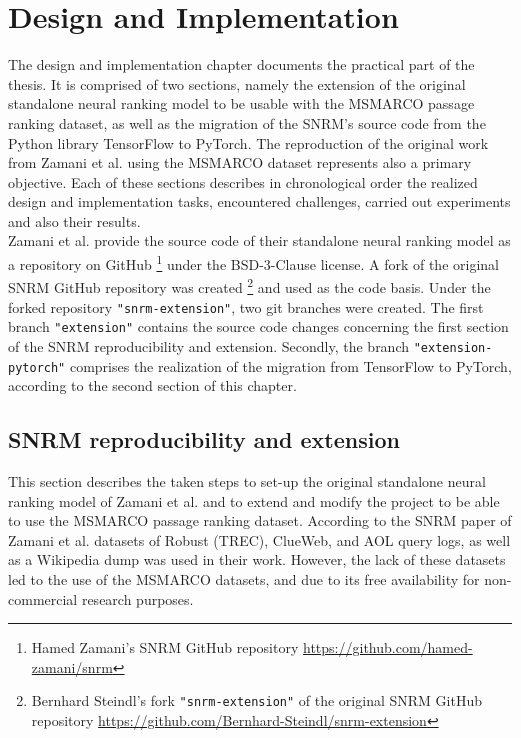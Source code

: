 \chapter{Design and Implementation} \label{chapter:design-and-implementation}

The design and implementation chapter documents the practical part of the thesis.
It is comprised of two sections, namely the extension of the original standalone neural
    ranking model to be usable with the MSMARCO passage ranking dataset,
    as well as the migration of the SNRM's source code from the Python library TensorFlow 
    to PyTorch.
The reproduction of the original work from 
    Zamani et al. \cite{zamani:2018:from-neural-reranking-to-neural-ranking}
    using the MSMARCO dataset represents also a primary objective.
Each of these sections describes in chronological order the realized
    design and implementation tasks, encountered challenges, 
    carried out experiments and also their results.\\
Zamani et al. provide the source code of their standalone neural ranking model as a
    repository on GitHub
    \footnote{Hamed Zamani's SNRM GitHub repository \url{https://github.com/hamed-zamani/snrm}}
    under the BSD-3-Clause license.
A fork of the original SNRM GitHub repository was created
    \footnote{Bernhard Steindl's fork \texttt{"snrm-extension"} of the original SNRM GitHub repository \url{https://github.com/Bernhard-Steindl/snrm-extension}}
    and used as the code basis.
Under the forked repository \texttt{"snrm-extension"}, two git branches were created.
The first branch \texttt{"extension"} contains the source code changes concerning the first
    section of the SNRM reproducibility and extension.
Secondly, the branch \texttt{"extension-pytorch"} comprises the realization of the migration
    from TensorFlow to PyTorch, according to the second section of this chapter.


\section{SNRM reproducibility and extension}
This section describes the taken steps to set-up the original standalone neural ranking model of Zamani et al.
    and to extend and modify the project to be able to use the MSMARCO passage ranking dataset.
According to the SNRM paper of Zamani et al. \cite{zamani:2018:from-neural-reranking-to-neural-ranking} 
    datasets of Robust (TREC), ClueWeb, and AOL query logs, as well as a Wikipedia dump was used
    in their work.
However, the lack of these datasets led to the use of the MSMARCO datasets, 
    and due to its free availability for non-commercial research purposes.

